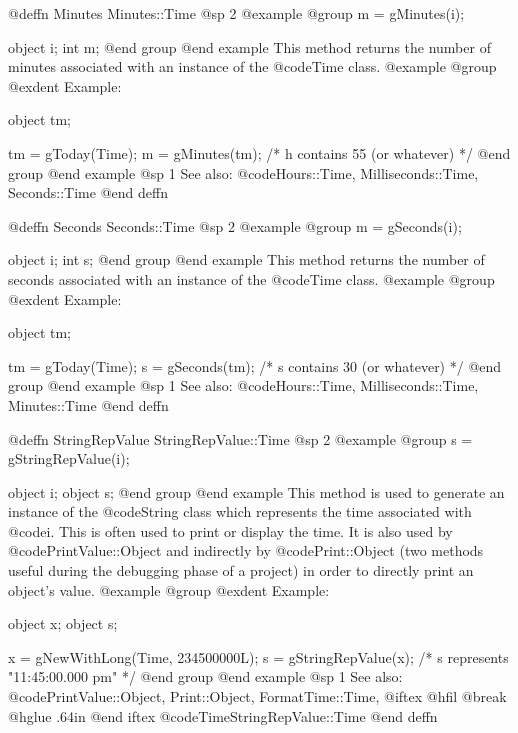 @deffn {Minutes} Minutes::Time
@sp 2
@example
@group
m = gMinutes(i);

object  i;
int     m;
@end group
@end example
This method returns the number of minutes associated with an
instance of the @code{Time} class.
@example
@group
@exdent Example:

object  tm;

tm = gToday(Time);
m = gMinutes(tm);   /*  h contains 55 (or whatever)  */
@end group
@end example
@sp 1
See also:  @code{Hours::Time, Milliseconds::Time, Seconds::Time}
@end deffn
















@deffn {Seconds} Seconds::Time
@sp 2
@example
@group
m = gSeconds(i);

object  i;
int     s;
@end group
@end example
This method returns the number of seconds associated with an
instance of the @code{Time} class.
@example
@group
@exdent Example:

object  tm;

tm = gToday(Time);
s = gSeconds(tm);   /*  s contains 30 (or whatever)  */
@end group
@end example
@sp 1
See also:  @code{Hours::Time, Milliseconds::Time, Minutes::Time}
@end deffn
















@deffn {StringRepValue} StringRepValue::Time
@sp 2
@example
@group
s = gStringRepValue(i);

object  i;
object  s;
@end group
@end example
This method is used to generate an instance of the @code{String} class
which represents the time associated with @code{i}.  This is often
used to print or display the time.  It is also used by
@code{PrintValue::Object} and indirectly by @code{Print::Object}
(two methods useful during the debugging phase of a project)
in order to directly print an object's value.
@example
@group
@exdent Example:

object  x;
object  s;

x = gNewWithLong(Time, 234500000L);
s = gStringRepValue(x);
   /*  s represents "11:45:00.000 pm"  */
@end group
@end example
@sp 1
See also:  @code{PrintValue::Object, Print::Object, FormatTime::Time,}
@iftex
@hfil @break @hglue .64in      
@end iftex
@code{TimeStringRepValue::Time}
@end deffn










